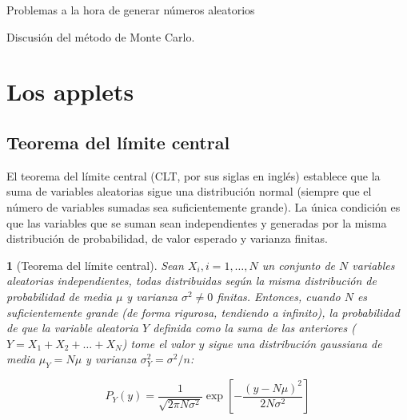 \documentclass[11pt, a4paper]{article} %
\theoremstyle{named}
\newtheorem*{namedtheorem}{}
\begin{document}
    Problemas a la hora de generar números aleatorios

    Discusión del método de Monte Carlo.

\newpage
\section{Los applets}\label{sec:apps}


    \subsection{Teorema del límite central}\label{sec:central}

        El teorema del límite central (CLT, por sus siglas en inglés) establece que la suma de variables aleatorias sigue una distribución normal (siempre que el número de variables sumadas sea suficientemente grande). La única condición es que las variables que se suman sean independientes y generadas por la misma distribución de probabilidad, de valor esperado y varianza finitas.

        \begin{namedtheorem}[Teorema del límite central]
            Sean $X_i, i = 1,\dots, N$ un conjunto de $N$ variables aleatorias independientes, todas distribuidas según la misma distribución de probabilidad de media $\mu$ y varianza $\sigma^2 \neq 0$ finitas.
            Entonces, cuando $N$ es suficientemente grande (de forma rigurosa, tendiendo a infinito), la probabilidad de que la variable aleatoria $Y$ definida como la suma de las anteriores ($Y = X_1 + X_2 + \dots + X_N$) tome el valor $y$ sigue una distribución gaussiana de media $\mu_Y = N \mu$ y varianza $\sigma_Y^2 = \sigma^2/n$:

            \begin{equation}
            P_{Y}(y)=\frac{1}{\sqrt{2 \pi N \sigma^{2}}} \exp \left[-\frac{(y-N \mu)^{2}}{2 N \sigma^{2}}\right]
            \end{equation}
        \end{namedtheorem}
\end{document}
